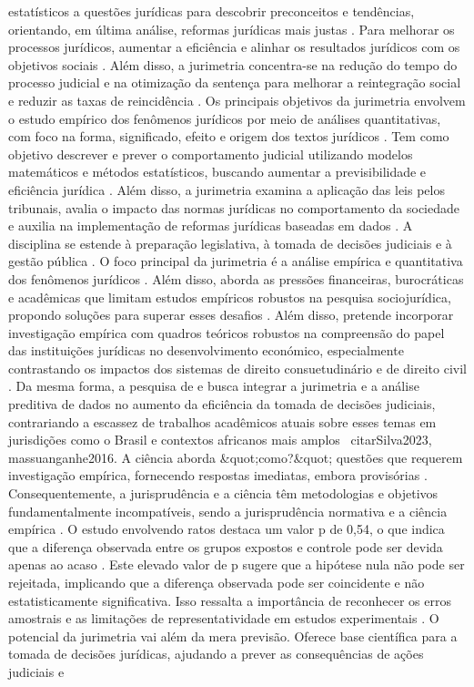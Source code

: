 \begin{agradecimentos}
estatísticos a questões jurídicas para descobrir preconceitos e tendências, orientando, em última análise, reformas jurídicas mais justas \cite{massuanganhe2016, maia2019}. Para melhorar os processos jurídicos, aumentar a eficiência e alinhar os resultados jurídicos com os objetivos sociais \cite{massuanganhe2016, luvizotto2020}. Além disso, a jurimetria concentra-se na redução do tempo do processo judicial e na otimização da sentença para melhorar a reintegração social e reduzir as taxas de reincidência \cite{nunes2018}. Os principais objetivos da jurimetria envolvem o estudo empírico dos fenômenos jurídicos por meio de análises quantitativas, com foco na forma, significado, efeito e origem dos textos jurídicos \cite{de2010}. Tem como objetivo descrever e prever o comportamento judicial utilizando modelos matemáticos e métodos estatísticos, buscando aumentar a previsibilidade e eficiência jurídica \cite{loevinger1949, nunes2018}. Além disso, a jurimetria examina a aplicação das leis pelos tribunais, avalia o impacto das normas jurídicas no comportamento da sociedade e auxilia na implementação de reformas jurídicas baseadas em dados \cite{nunes2018, nunes2018, massuanganhe2016}. A disciplina se estende à preparação legislativa, à tomada de decisões judiciais e à gestão pública \cite{zabala1809}. O foco principal da jurimetria é a análise empírica e quantitativa dos fenômenos jurídicos \cite{calvo2024, calvo2024}. Além disso, aborda as pressões financeiras, burocráticas e acadêmicas que limitam estudos empíricos robustos na pesquisa sociojurídica, propondo soluções para superar esses desafios \cite{calvo2024}. Além disso, \cite{borges2015} pretende incorporar investigação empírica com quadros teóricos robustos na compreensão do papel das instituições jurídicas no desenvolvimento económico, especialmente contrastando os impactos dos sistemas de direito consuetudinário e de direito civil \cite{borges2015, borges2015}. Da mesma forma, a pesquisa de \cite{Silva2023} e \cite{massuanganhe2016} busca integrar a jurimetria e a análise preditiva de dados no aumento da eficiência da tomada de decisões judiciais, contrariando a escassez de trabalhos acadêmicos atuais sobre esses temas em jurisdições como o Brasil e contextos africanos mais amplos \ citar{Silva2023, massuanganhe2016}. A ciência aborda &quot;como?&quot; questões que requerem investigação empírica, fornecendo respostas imediatas, embora provisórias \cite{loevinger1949}. Consequentemente, a jurisprudência e a ciência têm metodologias e objetivos fundamentalmente incompatíveis, sendo a jurisprudência normativa e a ciência empírica \cite{loevinger1949}. O estudo envolvendo ratos destaca um valor p de 0,54, o que indica que a diferença observada entre os grupos expostos e controle pode ser devida apenas ao acaso \cite{nunes2018}. Este elevado valor de p sugere que a hipótese nula não pode ser rejeitada, implicando que a diferença observada pode ser coincidente e não estatisticamente significativa. Isso ressalta a importância de reconhecer os erros amostrais e as limitações de representatividade em estudos experimentais \cite{nunes2018}. O potencial da jurimetria vai além da mera previsão. Oferece base científica para a tomada de decisões jurídicas, ajudando a prever as consequências de ações judiciais e 
\end{agradecimentos}
